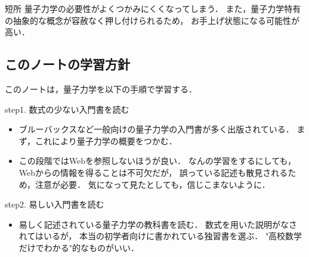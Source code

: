             \begin{mysmallsec}{短所}
                量子力学の必要性がよくつかみにくくなってしまう．
                また，量子力学特有の抽象的な概念が容赦なく押し付けられるため，
                お手上げ状態になる可能性が高い．
            \end{mysmallsec}

        \subsection{このノートの学習方針}
            このノートは，量子力学を以下の手順で学習する．
            \begin{mysmallsec}{step1. 数式の少ない入門書を読む}
                \begin{itemize}
                \item ブルーバックスなど一般向けの量子力学の入門書が多く出版されている．
                      まず，これにより量子力学の概要をつかむ．
                \item この段階ではWebを参照しないほうが良い．
                      なんの学習をするにしても，Webからの情報を得ることは不可欠だが，
                      誤っている記述も散見されるため，注意が必要．
                      気になって見たとしても，信じこまないように．
                \end{itemize}
            \end{mysmallsec}

            \begin{mysmallsec}{step2. 易しい入門書を読む}
                \begin{itemize}
                \item 易しく記述されている量子力学の教科書を読む．
                      数式を用いた説明がなされてはいるが，
                      本当の初学者向けに書かれている独習書を選ぶ．
                      "高校数学だけでわかる"的なものがいい．
                \end{itemize}
            \end{mysmallsec}

